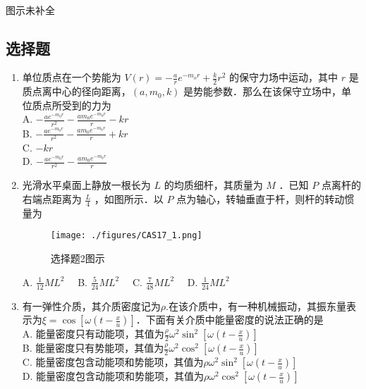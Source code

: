 
\begin{issues}
\issueTODO
\\ 图示未补全

\end{issues}



\subsection{选择题}
\begin{enumerate}
\item 单位质点在一个势能为 $V(r) = -\frac{a}{r}e^{-m_{o}r}+\frac{k}{2}r^{2}$ 的保守力场中运动，其中 $r$ 是质点离中心的径向距离，$(a,m_{0},k)$ 是势能参数．那么在该保守立场中，单位质点所受到的力为\\
A. $-\frac{ae^{-m_{0}r}}{r^{2}}-\frac{am_{0}e^{-m_{0}r}}{r}-kr$\\
B. $-\frac{ae^{-m_{0}r}}{r^{2}}-\frac{am_{0}e^{-m_{0}r}}{r}+kr$\\
C. $-kr$\\
D. $-\frac{ae^{-m_{0}r}}{r^{2}}-\frac{am_{0}e^{-m_{0}r}}{r}$\\

\item 光滑水平桌面上静放一根长为 $L$ 的均质细杆，其质量为 $M$ ．已知 $P$ 点离杆的右端点距离为 $\frac{L}{4}$ ，如图所示．以 $P$ 点为轴心，转轴垂直于杆，则杆的转动惯量为\\
\begin{figure}[ht]
\centering
\texttt{[image: ./figures/CAS17\_1.png]}
\caption{选择题2图示} \label{CAS17_fig1}
\end{figure}
A. $\frac{1}{12}ML^{2} \quad$
B. $\frac{5}{24}ML^{2} \quad$
C. $\frac{7}{48}ML^{2} \quad$
D. $\frac{1}{24}ML^{2} \quad$

\item 有一弹性介质，其介质密度记为$\rho$.在该介质中，有一种机械振动，其振东量表示为$\xi = \cos{[\omega(t-\frac{x}{u})]}$．下面有关介质中能量密度的说法正确的是\\
A. 能量密度只有动能项，其值为$\frac{\rho}{2}\omega^{2}\sin^{2}{[\omega(t-\frac{x}{u})]}$\\
B. 能量密度只有势能项，其值为$\frac{\rho}{2}\omega^{2}\cos^{2}{[\omega(t-\frac{x}{u})]}$\\
C. 能量密度包含动能项和势能项，其值为$\rho\omega^{2}\sin^{2}{[\omega(t-\frac{x}{u})]}$\\
D. 能量密度包含动能项和势能项，其值为$\rho\omega^{2}\cos^{2}{[\omega(t-\frac{x}{u})]}$\\


\end{enumerate}
